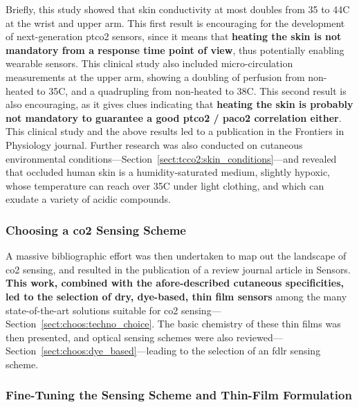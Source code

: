 Briefly, this study showed that skin conductivity at most doubles from 35 to 44{\degree}C at the wrist and upper arm. This first result is encouraging for the development of next-generation \gls{ptco2} sensors, since it means that \textbf{heating the skin is not mandatory from a response time point of view}, thus potentially enabling wearable sensors. This clinical study also included micro-circulation measurements at the upper arm, showing a doubling of perfusion from non-heated to 35{\degree}C, and a quadrupling from non-heated to 38{\degree}C. This second result is also encouraging, as it gives clues indicating that \textbf{heating the skin is probably not mandatory to guarantee a good \gls{ptco2} / \gls{paco2} correlation either}. This clinical study and the above results led to a publication in the Frontiers in Physiology journal\cite{dervieux2023rate}. Further research was also conducted on cutaneous environmental conditions---Section~\ref{sect:tcco2:skin_conditions}---and revealed that occluded human skin is a humidity-saturated medium, slightly hypoxic, whose temperature can reach over 35{\degree}C under light clothing, and which can exudate a variety of acidic compounds.

\subsubsection{Choosing a \texorpdfstring{\gls{co2}}{CO2} Sensing Scheme}

A massive bibliographic effort was then undertaken to map out the landscape of \gls{co2} sensing, and resulted in the publication of a review journal article in Sensors\cite{dervieux2022}. \textbf{This work, combined with the afore-described cutaneous specificities, led to the selection of dry, dye-based, thin film sensors} among the many state-of-the-art solutions suitable for \gls{co2} sensing---Section~\ref{sect:choos:techno_choice}. The basic chemistry of these thin films was then presented, and optical sensing schemes were also reviewed---Section~\ref{sect:choos:dye_based}---leading to the selection of an \gls{fdlr} sensing scheme.

\subsubsection{Fine-Tuning the Sensing Scheme and Thin-Film Formulation}

